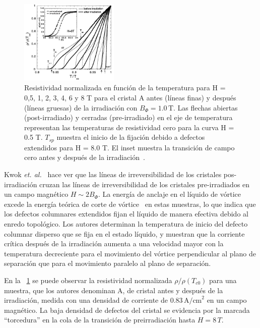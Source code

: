 \documentclass[a4paper,conference]{IEEEtran}
\begin{document}
\begin{figure}[!ht]
				\centering 
				\includegraphics[width=0.42\textwidth]{pre_pos_irradiado}
				\caption{
								Resistividad normalizada en funci\'{o}n de la temperatura para H =
								0,5, 1, 2, 3, 4, 6 y 8 T para el cristal A antes (l\'{i}neas finas)
								y despu\'{e}s (l\'{i}neas gruesas) de la irradiaci\'{o}n con $B_\Phi =
								1.0\,\text{T}$. Las flechas abiertas (post-irradiado) y cerradas
								(pre-irradiado) en el eje de temperatura representan las
								temperaturas de resistividad cero para la curva H = 0.5 T.
								$T_{sp}$ muestra el inicio de la fijaci\'{o}n debido a defectos
								extendidos para H = 8.0 T. El inset muestra la transici\'{o}n de
								campo cero antes y despu\'{e}s de	la irradiaci\'{o}n~\cite{Kwok1998}.
				} 
				\label{fig:pre_pos}
\end{figure}

Kwok \textit{et. al.}~\cite{Kwok1998} hace ver que las l\'{i}neas de
irreversibilidad de los cristales pos-irradiaci\'{o}n cruzan las l\'{i}neas de
irreversibilidad de los cristales pre-irradiados en un campo magn\'{e}tico $H
\sim 2B_\Phi$. La energ\'{i}a de anclaje en el l\'{i}quido de v\'{o}rtice excede
la energ\'{i}a te\'{o}rica de corte de v\'{o}rtice~\cite{Moore1994} en estas
muestras, lo que indica que los defectos columnares extendidos fijan el
l\'{i}quido de manera efectiva debido al enredo topol\'{o}gico. Los autores
determinan la temperatura de inicio del defecto columnar disperso que se fija en
el estado l\'{i}quido, y muestran que la corriente cr\'{i}tica despu\'{e}s de la
irradiaci\'{o}n aumenta a una velocidad mayor con la temperatura decreciente
para el movimiento del v\'{o}rtice perpendicular al plano de separaci\'{o}n que
para el movimiento paralelo al plano de separaci\'{o}n.

En la \figurename~\ref{fig:pre_pos} se puede observar la resistividad
normalizada $\rho/\rho (T_{c0})$ para una muestra, que los autores denominan A,
de cristal antes y despu\'{e}s de la irradiaci\'{o}n, medida con una densidad de
corriente de $0.83\,\text{A/cm}^2$ en un campo magn\'{e}tico. La baja densidad de 
defectos del cristal se evidencia por la marcada ``torcedura'' en la cola de la
transici\'{o}n de preirradiaci\'{o}n hasta $H = 8\,T$. 
\end{document}
